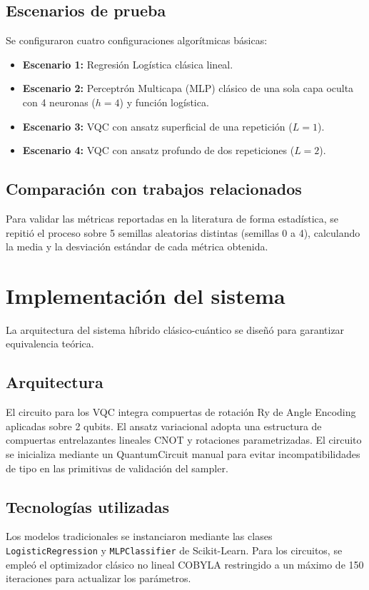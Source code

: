 \documentclass[12pt,oneside]{report}
\begin{document}
\subsection{Escenarios de prueba}
Se configuraron cuatro configuraciones algorítmicas básicas:
\begin{itemize}
    \item \textbf{Escenario 1:} Regresión Logística clásica lineal.
    \item \textbf{Escenario 2:} Perceptrón Multicapa (MLP) clásico de una sola capa oculta con 4 neuronas ($h = 4$) y función logística.
    \item \textbf{Escenario 3:} VQC con ansatz superficial de una repetición ($L=1$).
    \item \textbf{Escenario 4:} VQC con ansatz profundo de dos repeticiones ($L=2$).
\end{itemize}

\subsection{Comparación con trabajos relacionados}
Para validar las métricas reportadas en la literatura de forma estadística, se repitió el proceso sobre 5 semillas aleatorias distintas (semillas 0 a 4), calculando la media y la desviación estándar de cada métrica obtenida.

\section{Implementación del sistema}
La arquitectura del sistema híbrido clásico-cuántico se diseñó para garantizar equivalencia teórica.

\subsection{Arquitectura}
El circuito para los VQC integra compuertas de rotación Ry de Angle Encoding aplicadas sobre 2 qubits. El ansatz variacional adopta una estructura de compuertas entrelazantes lineales CNOT y rotaciones parametrizadas. El circuito se inicializa mediante un QuantumCircuit manual para evitar incompatibilidades de tipo en las primitivas de validación del sampler.

\subsection{Tecnologías utilizadas}
Los modelos tradicionales se instanciaron mediante las clases \texttt{LogisticRegression} y \texttt{MLPClassifier} de Scikit-Learn. Para los circuitos, se empleó el optimizador clásico no lineal COBYLA restringido a un máximo de 150 iteraciones para actualizar los parámetros.
\end{document}
